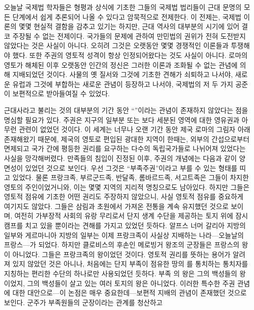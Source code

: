 오늘날 국제법 학자들은
형평과 상식에 기초한
그들의 국제법 법리들이
근대 문명의 모든 단계에서 쉽게 추론되어 나올 수 있다고
암묵적으로 전제한다.
이 전제는, 국제법 이론의 몇몇 현실적 결함을 감추고 있기는 하지만,
근대 역사의 대부분의 시기에 있어 결코 주장될 수 없는 전제이다.
국가들의 문제에 관하여 만민법의 권위가
전혀 도전받지 않았다는 것은 사실이 아니다.
오히려 그것은 오랫동안 몇몇 경쟁적인 이론들과 투쟁해야 했다.
또한 주권의 영토적 성격이 항상 인정되어왔다는 것도 사실이 아니다.
로마의 영토가 해체된 이후 오랫동안 인간의 정신은 그러한 이론과
조화될 수 없는 관념에 의해 지배되었던 것이다.
사물의 옛 질서와 그것에 기초한 견해가 쇠퇴하고 나서야,
새로운 유럽과 그것에 부합하는 새로운 관념이 등장하고 나서야,
국제법의 저 두 가지 공준이 보편적으로 받아들여질 수 있었다.

근대사라고 불리는 것의 대부분의 기간 동안
``''이라는 관념이
존재하지 않았다는 점을 명심할 필요가 있다.
주권은 지구의 일부분 또는 보다 세분된 영역에 대한 영유권과
아무런 관련이 없었던 것이다.
이 세계는 너무나 오랜 기간 동안 제국 로마의 그림자 아래 존재해왔기 때문에,
제국의 영토로 편입된 광대한 지역이 한때는,
외부의 간섭으로부터 면제되고 국가 간에 평등한 권리를 요구하는
다수의 독립국가들로 나뉘어져 있었다는 사실을 망각해버렸다.
만족들의 침입이 진정된 이후,
주권의 개념에는 다음과 같이 양면성이 있었던 것으로 보인다.
우선 그것은 ``부족주권''이라고 부를 수 있는
형태를 띠고 있었다.
물론
프랑크족, 부르군드족, 반달족, 롬바르드족, 서고트족은
그들이 차지한 영토의 주인이었거니와,
이는 몇몇 지역의 지리적 명칭으로도 남아있다.
하지만 그들은 영토적 점유에 기초한 어떤 권리도 주장하지 않았으니,
사실 영토적 점유를 중요하게 여기지도 않았다.
그들은 삼림과 초원에서 가져온 전통을 계속 유지했던 것으로 보이며,
여전히 가부장적 사회의 유랑 무리로서
단지 생계 수단을 제공하는 토지 위에 잠시
캠프를 치고 있을 뿐이라는 견해를 가지고 있었던 듯하다.
알프스 너머 갈리아 지방의 일부와 게르마니아 지방의 일부는
이제 프랑크족이 사실상 지배하는 나라---오늘날의 프랑스---가 되었다.
하지만 클로비스의 후손인 메로빙거 왕조의 군장들은
프랑스의 왕이 아니었다. 그들은 프랑크족의 왕이었던 것이다.
영토적 권리를 뜻하는 용어가 알려져 있지 않았던 것은 아니나,
처음에는 단지 부족이 점유한 땅의 를
통치하는 통치자를 지칭하는 편리한 수단의 하나로만 사용되었던 듯하다.
부족 의 왕은 그의 백성들의 왕이었지,
그의 백성들이 살고 있는 여러 토지의 왕은 아니었다.
이러한 특수한 주권 관념에 대한
대안으로---이 논점은 매우 중요한데---보편적 지배의 관념이
존재했던 것으로 보인다.
군주가 부족원들의 군장이라는 관계를 청산하고

